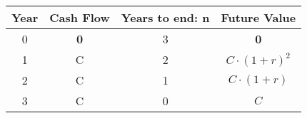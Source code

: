 \begin{tabular}{|c|c|c|c|}
\hline
Year  & Cash Flow & Years to end: \textbf{n} & Future Value \\
\hline
0 & \textbf{0} & 3 & \textbf{0} \\
1 & C & 2 & $C\cdot(1+r)^2$\\
2 & C & 1 & $C\cdot(1+r)$ \\
3 & C & 0 & $C$ \\
\hline
\end{tabular}